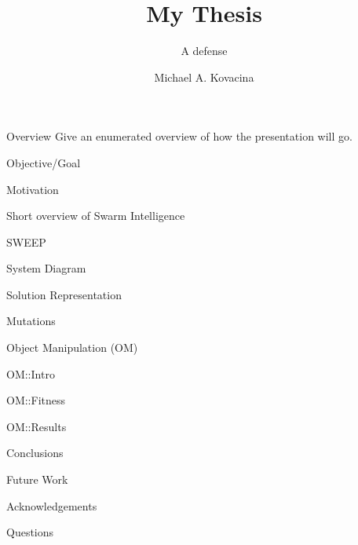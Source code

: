 \documentclass[pdf,blends,slideColor]{prosper}
\title{My Thesis}
\subtitle{A defense}
\author{Michael A. Kovacina}
\begin{document}
\maketitle

\begin{slide}{Overview}
Give an enumerated overview of how the presentation will go.
\end{slide}

\begin{slide}{Objective/Goal}
\end{slide}

\begin{slide}{Motivation}
\end{slide}

\begin{slide}{Short overview of Swarm Intelligence}
\end{slide}

\begin{slide}{SWEEP}
\end{slide}

\begin{slide}{System Diagram}
\end{slide}

\begin{slide}{Solution Representation}
\end{slide}

\begin{slide}{Mutations}
\end{slide}

\begin{slide}{Object Manipulation (OM)}
\end{slide}

\begin{slide}{OM::Intro}
\end{slide}

\begin{slide}{OM::Fitness}
\end{slide}

\begin{slide}{OM::Results}
\end{slide}

\begin{slide}{Conclusions}
\end{slide}

\begin{slide}{Future Work}
\end{slide}

\begin{slide}{Acknowledgements}
\end{slide}

\begin{slide}{Questions}
\end{slide}
\end{document}
